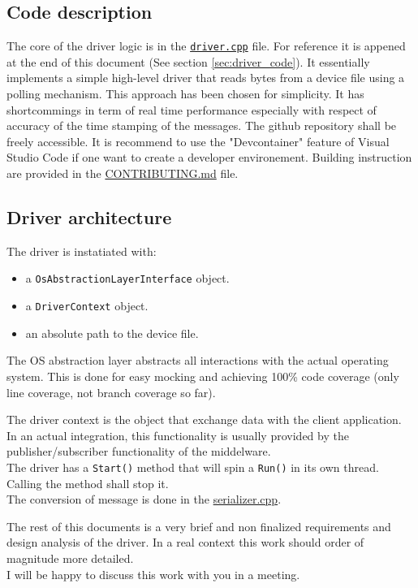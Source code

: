 \subsection{Code description}
The core of the driver logic is in the \href{https://github.com/renn0xtek9/assignment/blob/master/flight_software/libs/embedded_software/uart_imu_driver/src/driver.cpp}{\texttt{driver.cpp}} file.
For reference it is appened at the end of this document (See section \ref{sec:driver_code}).
It essentially implements a simple high-level driver that reads bytes from a device file using a polling mechanism.
This approach has been chosen for simplicity.
It has shortcommings in term of real time performance especially with respect of accuracy of the time stamping of the messages.
The github repository shall be freely accessible. It is recommend to use the "Devcontainer" feature of Visual Studio Code if one want to create a developer environement.
Building instruction are provided in the \href{https://github.com/renn0xtek9/assignment/blob/master/CONTRIBUTING.md}{CONTRIBUTING.md} file.

\subsection{Driver architecture}
The driver is instatiated with:
\begin{itemize}
    \item a \texttt{OsAbstractionLayerInterface} object.
    \item a \texttt{DriverContext} object.
    \item an absolute path to the device file.
\end{itemize}

The OS abstraction layer abstracts all interactions with the actual operating system.
This is done for easy mocking and achieving 100\% code coverage (only line coverage, not branch coverage so far).

The driver context is the object that exchange data with the client application.
In an actual integration, this functionality is usually provided by the publisher/subscriber functionality of the middelware.\\
The driver has a \texttt{Start()} method that will spin a \texttt{Run()} in its own thread.
Calling the  method shall stop it.\\
The conversion of message is done in the \href{https://github.com/renn0xtek9/assignment/blob/master/flight_software/libs/embedded_software/serializer/src/serializer.cpp}{serializer.cpp}.

The rest of this documents is a very brief and non finalized requirements and design analysis of the driver.
In a real context this work should order of magnitude more detailed.\\
I will be happy to discuss this work with you in a meeting.
